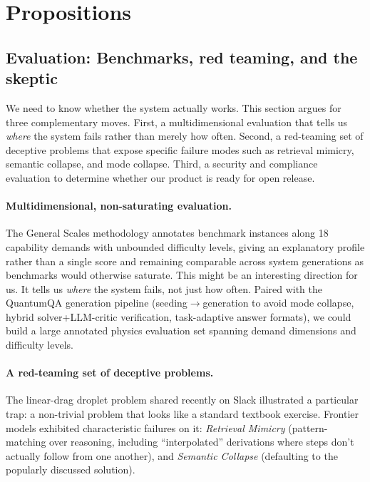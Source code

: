 \section{Propositions}
\label{section:proposition}

\subsection{Evaluation: Benchmarks, red teaming, and the skeptic}
\label{section:Evaluation}

\begin{summarybox}
We need to know whether the system actually works. This section argues for three complementary moves. First, a multidimensional evaluation that tells us \emph{where} the system fails rather than merely how often. Second, a red-teaming set of deceptive problems that expose specific failure modes such as retrieval mimicry, semantic collapse, and mode collapse. Third, a security and compliance evaluation to determine whether our product is ready for open release.
\end{summarybox}


\paragraph{Multidimensional, non-saturating evaluation.} The General Scales methodology \cite{Zhou2026} annotates benchmark instances along 18 capability demands with unbounded difficulty levels, giving an explanatory profile rather than a single score and remaining comparable across system generations as benchmarks would otherwise saturate. This might be an interesting direction for us. It tells us \emph{where} the system fails, not just how often. Paired with the QuantumQA generation pipeline \cite{2604.18176} (seeding$\rightarrow$generation to avoid mode collapse, hybrid solver+LLM-critic verification, task-adaptive answer formats), we could build a large annotated physics evaluation set spanning demand dimensions and difficulty levels.

\paragraph{A red-teaming set of deceptive problems.} The linear-drag droplet problem shared recently on Slack illustrated a particular trap: a non-trivial problem that looks like a standard textbook exercise. Frontier models exhibited characteristic failures on it: \emph{Retrieval Mimicry} (pattern-matching over reasoning, including ``interpolated'' derivations where steps don't actually follow from one another), and \emph{Semantic Collapse} (defaulting to the popularly discussed solution).

